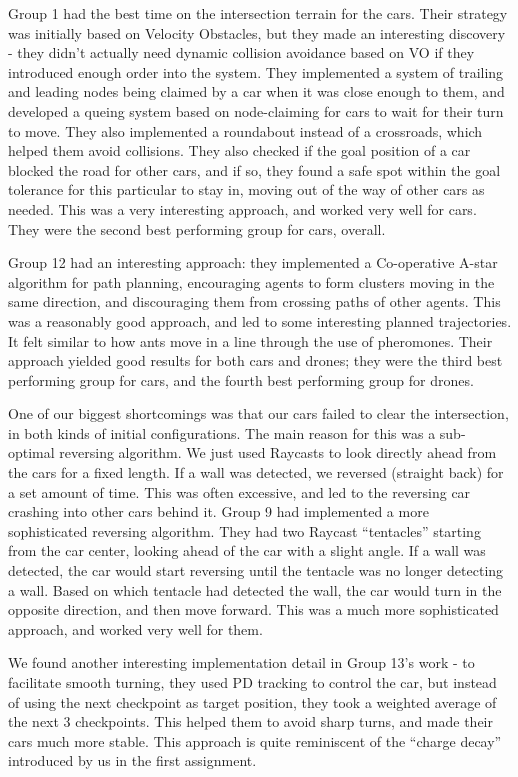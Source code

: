 \documentclass[a4paper,12pt]{article}
\begin{document}
Group 1 had the best time on the intersection terrain for the cars. Their strategy was initially based on Velocity Obstacles, but they made an interesting discovery - they didn't actually need dynamic collision avoidance based on VO if they introduced enough order into the system. They implemented a system of trailing and leading nodes being claimed by a car when it was close enough to them, and developed a queing system based on node-claiming for cars to wait for their turn to move. They also implemented a roundabout instead of a crossroads, which helped them avoid collisions. They also checked if the goal position of a car blocked the road for other cars, and if so, they found a safe spot within the goal tolerance for this particular to stay in, moving out of the way of other cars as needed. This was a very interesting approach, and worked very well for cars. They were the second best performing group for cars, overall.

Group 12 had an interesting approach: they implemented a Co-operative A-star algorithm for path planning, encouraging agents to form clusters moving in the same direction, and discouraging them from crossing paths of other agents. This was a reasonably good approach, and led to some interesting planned trajectories. It felt similar to how ants move in a line through the use of pheromones. Their approach yielded good results for both cars and drones; they were the third best performing group for cars, and the fourth best performing group for drones.

One of our biggest shortcomings was that our cars failed to clear the intersection, in both kinds of initial configurations. The main reason for this was a sub-optimal reversing algorithm. We just used Raycasts to look directly ahead from the cars for a fixed length. If a wall was detected, we reversed (straight back) for a set amount of time. This was often excessive, and led to the reversing car crashing into other cars behind it. Group 9 had implemented a more sophisticated reversing algorithm. They had two Raycast ``tentacles'' starting from the car center, looking ahead of the car with a slight angle. If a wall was detected, the car would start reversing until the tentacle was no longer detecting a wall. Based on which tentacle had detected the wall, the car would turn in the opposite direction, and then move forward. This was a much more sophisticated approach, and worked very well for them.

We found another interesting implementation detail in Group 13's work - to facilitate smooth turning, they used PD tracking to control the car, but instead of using the next checkpoint as target position, they took a weighted average of the next 3 checkpoints. This helped them to avoid sharp turns, and made their cars much more stable. This approach is quite reminiscent of the ``charge decay'' introduced by us in the first assignment.
\end{document}
